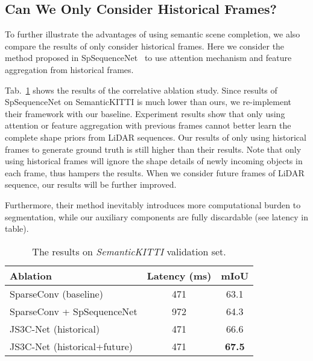 \documentclass[letterpaper]{article} \usepackage{aaai21}  \usepackage{times}  \usepackage{helvet} \usepackage{courier}  \usepackage[hyphens]{url}  \usepackage{graphicx} \urlstyle{rm} \def\UrlFont{\rm}  \usepackage{natbib}  \usepackage{booktabs}
\begin{document}
	\subsection{Can We Only Consider Historical Frames?}
To further illustrate the advantages of using semantic scene completion, we also compare the results of only consider historical frames.
Here we consider the method proposed in SpSequenceNet~\cite{shi2020spsequencenet} to use attention mechanism and feature aggregation from historical frames.
	
	Tab.~\ref{tab:his} shows the results of the correlative ablation study.
Since results of SpSequenceNet on SemanticKITTI is much lower than ours, we re-implement their framework with our baseline.
Experiment results show that only using attention or feature aggregation with previous frames cannot better learn the complete shape priors from LiDAR sequences.
Our results of only using historical frames to generate ground truth is still higher than their results.
Note that only using historical frames will ignore the shape details of newly incoming objects in each frame, thus hampers the results.
When we consider future frames of LiDAR sequence, our results will be further improved. 
	
	Furthermore, their method inevitably introduces more computational burden to segmentation, while our auxiliary components are fully discardable (see latency in table).
	
	\begin{table}
	\small
	\caption{The results on \textit{SemanticKITTI} validation set.}

	\begin{center}

	\begin{tabular}{lcc}
		\hline
		Ablation & Latency (ms)& mIoU \\
		\hline
		\hline
		SparseConv (baseline) & 471 & 63.1  \\
		SparseConv + SpSequenceNet & 972 & {64.3}  \\
		JS3C-Net (historical) & 471 & {66.6}  \\
		JS3C-Net (historical+future) & 471 & \textbf{67.5}  \\
		\hline
	\end{tabular}
	\end{center}
		
	\label{tab:his}
	\end{table}
	
\end{document}
